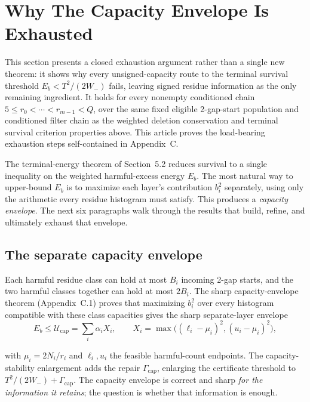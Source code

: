 \section{Why The Capacity Envelope Is Exhausted}
\label{sec:why-capacity-envelope-exhausted}

This section presents a closed exhaustion argument rather than a single new
theorem: it shows why every unsigned-capacity route to the terminal survival
threshold $E_b\lt T^2/(2W_-)$ fails, leaving signed residue information as
the only remaining ingredient. It holds for every nonempty conditioned chain
$5\le r_0\lt\cdots\lt r_{m-1}\lt Q$, over the same fixed eligible 2-gap-start
population and conditioned filter chain as the weighted deletion conservation
and terminal survival criterion properties above. This article proves the
load-bearing exhaustion steps self-contained in Appendix~C.

The terminal-energy theorem of Section~5.2 reduces survival to a single inequality
on the weighted harmful-excess energy $E_b$. The most natural way to
upper-bound $E_b$ is to maximize each layer's contribution $b_i^2$ separately,
using only the arithmetic every residue histogram must satisfy. This produces
a \emph{capacity envelope}. The next six paragraphs walk through the results that
build, refine, and ultimately exhaust that envelope.

\subsection{The separate capacity envelope}
\label{sec:separate-capacity-envelope}

Each harmful residue class can hold at most $B_i$ incoming 2-gap starts, and
the two harmful classes together can hold at most $2B_i$. The sharp
capacity-envelope theorem (Appendix~C.1) proves that maximizing $b_i^2$ over
every histogram compatible with these class capacities gives the sharp
separate-layer envelope
\begin{equation*}
E_b\le\mathcal U_{\mathrm{cap}}
=\sum_i\alpha_iX_i,
\qquad
X_i=\max\bigl((\ell_i-\mu_i)^2,(u_i-\mu_i)^2\bigr),
\end{equation*}

with $\mu_i=2N_i/r_i$ and $\ell_i,u_i$ the feasible harmful-count endpoints.
The capacity-stability enlargement adds the repair
$\Gamma_{\mathrm{cap}}$, enlarging the certificate threshold to
$T^2/(2W_-)+\Gamma_{\mathrm{cap}}$. The capacity envelope is correct and
sharp \emph{for the information it retains}; the question is whether that
information is enough.

